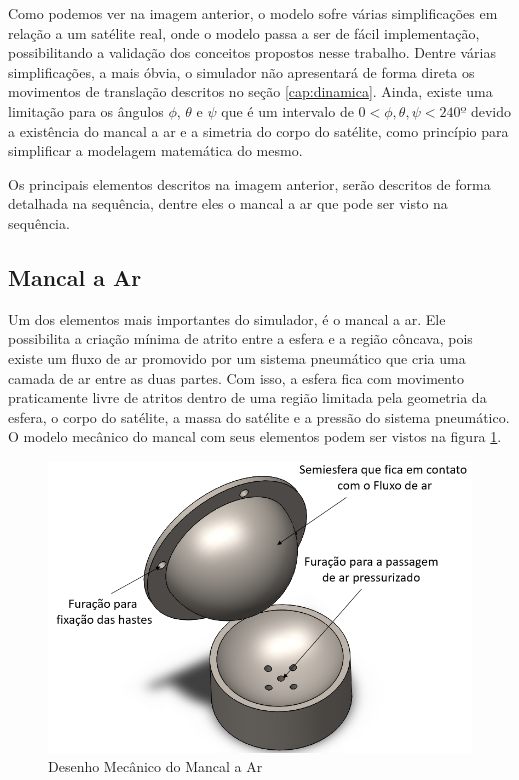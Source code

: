  Como podemos ver na imagem anterior, o modelo sofre várias simplificações em relação a um satélite real, onde o modelo passa a ser de fácil implementação, possibilitando a validação dos conceitos propostos nesse trabalho. Dentre várias simplificações, a mais óbvia, o simulador não apresentará de forma direta os movimentos de translação descritos no seção \ref{cap:dinamica}. Ainda, existe uma limitação para os ângulos $\phi$, $\theta$ e $\psi$ que é um intervalo de $0<\phi, \theta, \psi<240º$ devido a existência do mancal a ar e a simetria do corpo do satélite, como princípio para simplificar a modelagem matemática do mesmo.

Os principais elementos descritos na imagem anterior, serão descritos de forma detalhada na sequência, dentre eles o mancal a ar que pode ser visto na sequência.



\subsection{Mancal a Ar}

Um dos elementos mais importantes do simulador, é o mancal a ar. Ele possibilita a criação mínima de atrito entre a esfera e a região côncava, pois existe um fluxo de ar promovido por um sistema pneumático que cria uma camada de ar entre as duas partes. Com isso, a esfera fica com movimento praticamente livre de atritos dentro de uma região limitada pela geometria da esfera, o corpo do satélite, a massa do satélite e a pressão do sistema pneumático. O modelo mecânico do mancal com seus elementos podem ser vistos na figura \ref{fig:base_desenho}.

\begin{figure}[H]
  \caption{Desenho Mecânico do Mancal a Ar}
  \begin{center}
      \includegraphics[scale=.45]{img/base_desenho}
  \end{center}
  \label{fig:base_desenho}
\end{figure}

